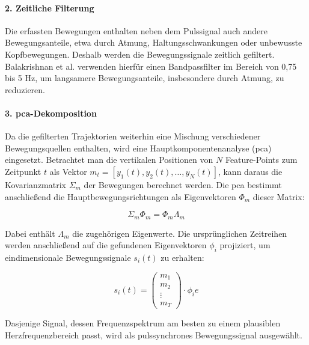 \paragraph{2. Zeitliche Filterung} Die erfassten Bewegungen enthalten neben dem Pulssignal auch andere Bewegungsanteile, etwa durch Atmung, Haltungsschwankungen oder unbewusste Kopfbewegungen. Deshalb werden die Bewegungssignale zeitlich gefiltert. Balakrishnan et al. verwenden hierfür einen Bandpassfilter im Bereich von 0,75 bis 5 Hz, um langsamere Bewegungsanteile, insbesondere durch Atmung, zu reduzieren.

\paragraph{3. \ac{pca}-Dekomposition} Da die gefilterten Trajektorien weiterhin eine Mischung verschiedener Bewegungsquellen enthalten, wird eine Hauptkomponentenanalyse (\ac{pca}) eingesetzt. Betrachtet man die vertikalen Positionen von $N$ Feature-Points zum Zeitpunkt $t$ als Vektor $m_t = [y_1(t), y_2(t), \dots, y_N(t)]$, kann daraus die Kovarianzmatrix $\Sigma_m$ der Bewegungen berechnet werden. Die \ac{pca} bestimmt anschließend die Hauptbewegungsrichtungen als Eigenvektoren $\Phi_m$ dieser Matrix:

\begin{equation}
\Sigma_m \Phi_m = \Phi_m \Lambda_m
\end{equation}

Dabei enthält $\Lambda_m$ die zugehörigen Eigenwerte. Die ursprünglichen Zeitreihen werden anschließend auf die gefundenen Eigenvektoren $\phi_i$ projiziert, um eindimensionale Bewegungssignale $s_i(t)$ zu erhalten:

\begin{equation}
s_i(t) =
\begin{pmatrix}
    m_1 \\
    m_2 \\
    \vdots \\
    m_T
\end{pmatrix}
\cdot \phi_ie
\end{equation}

Dasjenige Signal, dessen Frequenzspektrum am besten zu einem plausiblen Herzfrequenzbereich passt, wird als pulssynchrones Bewegungssignal ausgewählt.

